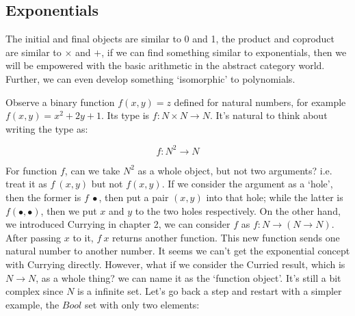 \documentclass{article}
\begin{document}
\begin{Exercise}
\end{Exercise}

\subsection{Exponentials}

The initial and final objects are similar to 0 and 1, the product and coproduct are similar to $\times$ and $+$, if we can find something similar to exponentials, then we will be empowered with the basic arithmetic in the abstract category world. Further, we can even develop something `isomorphic' to polynomials.

Observe a binary function $f(x, y) = z$ defined for natural numbers, for example $f(x, y) = x^2 + 2y + 1$. Its type is $f: N \times N \to N$. It's natural to think about writing the type as:

\[
f : N^2 \to N
\]

For function $f$, can we take $N^2$ as a whole object, but not two arguments? i.e. treat it as $f\ (x, y)$ but not $f(x, y)$. If we consider the argument as a `hole', then the former is $f\ \bullet$, then put a pair $(x, y)$ into that hole; while the latter is $f(\bullet, \bullet)$, then we put $x$ and $y$ to the two holes respectively. On the other hand, we introduced Currying in chapter 2, we can consider $f$ as $f: N \to (N \to N)$. After passing $x$ to it, $f\ x$ returns another function. This new function sends one natural number to another number. It seems we can't get the exponential concept with Currying directly. However, what if we consider the Curried result, which is $N \to N$, as a whole thing? we can name it as the `function object'. It's still a bit complex since $N$ is a infinite set. Let's go back a step and restart with a simpler example, the $Bool$ set with only two elements:
\end{document}
